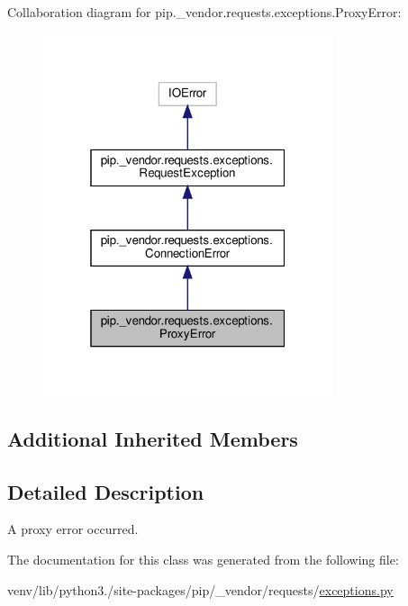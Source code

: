 Collaboration diagram for pip.\+\_\+vendor.\+requests.\+exceptions.\+Proxy\+Error\+:
\nopagebreak
\begin{figure}[H]
\begin{center}
\leavevmode
\includegraphics[width=241pt]{classpip_1_1__vendor_1_1requests_1_1exceptions_1_1ProxyError__coll__graph}
\end{center}
\end{figure}
\subsection*{Additional Inherited Members}


\subsection{Detailed Description}
\begin{DoxyVerb}A proxy error occurred.\end{DoxyVerb}
 

The documentation for this class was generated from the following file\+:\begin{DoxyCompactItemize}
\item 
venv/lib/python3./site-\/packages/pip/\+\_\+vendor/requests/\hyperlink{pip_2__vendor_2requests_2exceptions_8py}{exceptions.\+py}\end{DoxyCompactItemize}
